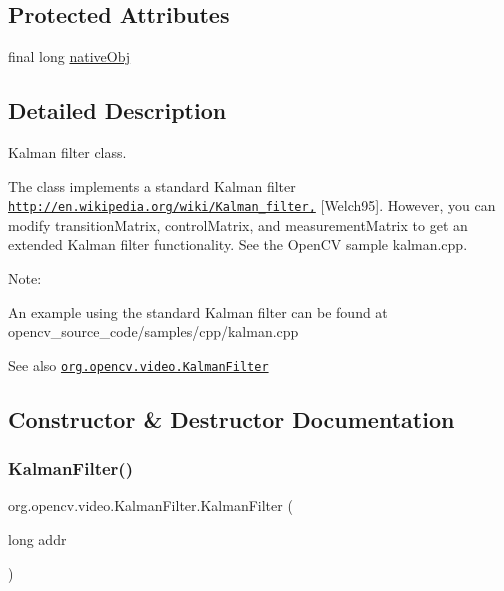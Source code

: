 \subsection*{Protected Attributes}
\begin{DoxyCompactItemize}
\item 
final long \mbox{\hyperlink{classorg_1_1opencv_1_1video_1_1_kalman_filter_a7cf49cefeb229d5e91ee31d40dde3104}{native\+Obj}}
\end{DoxyCompactItemize}


\subsection{Detailed Description}
Kalman filter class.

The class implements a standard Kalman filter \href{http://en.wikipedia.org/wiki/Kalman_filter,}{\tt http\+://en.\+wikipedia.\+org/wiki/\+Kalman\+\_\+filter,} \mbox{[}Welch95\mbox{]}. However, you can modify {\ttfamily transition\+Matrix}, {\ttfamily control\+Matrix}, and {\ttfamily measurement\+Matrix} to get an extended Kalman filter functionality. See the Open\+CV sample {\ttfamily kalman.\+cpp}.

Note\+:


\begin{DoxyItemize}
\item An example using the standard Kalman filter can be found at opencv\+\_\+source\+\_\+code/samples/cpp/kalman.\+cpp 
\end{DoxyItemize}

\begin{DoxySeeAlso}{See also}
\href{http://docs.opencv.org/modules/video/doc/motion_analysis_and_object_tracking.html#kalmanfilter}{\tt org.\+opencv.\+video.\+Kalman\+Filter} 
\end{DoxySeeAlso}


\subsection{Constructor \& Destructor Documentation}
\mbox{\label{classorg_1_1opencv_1_1video_1_1_kalman_filter_a81505b4a99d47a000f0a6e8000d8307f}} 
\subsubsection{\texorpdfstring{Kalman\+Filter()}{KalmanFilter()}\hspace{0.1cm}{\footnotesize\ttfamily [1/4]}}
{\footnotesize\ttfamily org.\+opencv.\+video.\+Kalman\+Filter.\+Kalman\+Filter (\begin{DoxyParamCaption}\item[{long}]{addr }\end{DoxyParamCaption})\hspace{0.3cm}{\ttfamily [protected]}}

